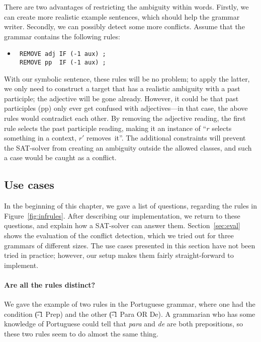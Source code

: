 {{There are two advantages of restricting the ambiguity within words.
Firstly, we can create more realistic example sentences, which should help the grammar writer.
Secondly, we can possibly detect some more conflicts. Assume that the grammar contains the following rules:

 \begin{itemize}
 \item[] 
\begin{verbatim}
 REMOVE adj IF (-1 aux) ;
 REMOVE pp  IF (-1 aux) ;
 \end{verbatim}
 \end{itemize}

 With our symbolic sentence, these rules will be no problem; to apply the latter, we only need to construct a target that has a realistic ambiguity with a past participle; the adjective will be gone already.
However, it could be that past participles (pp) only ever get confused with adjectives---in that case, the above rules would contradict each other.
 By removing the adjective reading, the first rule selects the past participle reading, making it an instance of ``$r$ selects something in a context, $r'$ removes~it''. 
The additional constraints will prevent the SAT-solver from creating an ambiguity outside the allowed classes, and such a case would be caught as a conflict.

\subsection{Use cases}

In the beginning of this chapter, we gave a list of questions, regarding the rules in Figure~\ref{fig:infrules}. After describing our implementation, we return to these questions, and explain how a SAT-solver can answer them. 
Section~\ref{sec:eval} shows the evaluation of the conflict detection, which we tried out for three grammars of different sizes. 
The use cases presented in this section have not been tried in practice; however, our setup makes them fairly straight-forward to implement.

\paragraph{Are all the rules distinct?} We gave the example of two rules in the Portuguese grammar, where one had the condition \t{(-1 Prep)} and the other \t{(-1 Para OR De)}. A grammarian who has some knowledge of Portuguese could tell that {\em para} and {\em de} are both prepositions, so these two rules seem to do almost the same thing.

}}
